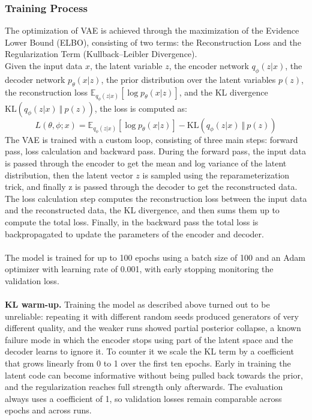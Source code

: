 \subsubsection{Training Process}
The optimization of VAE is achieved through the maximization of the Evidence Lower Bound (ELBO), consisting of two terms: the Reconstruction Loss and the Regularization Term (Kullback--Leibler Divergence).\\Given the input data $x$, the latent variable $z$, the encoder network $q_\phi(z\vert x)$, the decoder network $p_\theta(x\vert z)$, the prior distribution over the latent variables $p(z)$, the reconstruction loss $\mathbb{E}_{q_{\phi}(z\vert x)}[\log p_\theta(x\vert z)]$, and the KL divergence $\mathrm{KL}(q_\phi(z\vert x)\ \Vert\ p(z))$, the loss is computed as:
\\
\begin{equation}
L(\theta,\phi;x)=\mathbb{E}_{q_{\phi}(z\vert x)}[\log p_\theta(x\vert z)]-\mathrm{KL}(q_\phi(z\vert x)\ \Vert\ p(z))
\end{equation}
The VAE is trained with a custom loop, consisting of three main steps: forward pass, loss calculation and backward pass. During the forward pass, the input data is passed through the encoder to get the mean and log variance of the latent distribution, then the latent vector $z$ is sampled using the reparameterization trick, and finally z is passed through the decoder to get the reconstructed data. The loss calculation step computes the reconstruction loss between the input data and the reconstructed data, the KL divergence, and then sums them up to compute the total loss. Finally, in the backward pass the total loss is backpropagated to update the parameters of the encoder and decoder.
\\\\
The model is trained for up to 100 epochs using a batch size of 100 and an Adam optimizer \cite{kingma2015adam} with learning rate of 0.001, with early stopping monitoring the validation loss.
\\\\
\textbf{KL warm-up.} Training the model as described above turned out to be unreliable: repeating it with different random seeds produced generators of very different quality, and the weaker runs showed partial posterior collapse, a known failure mode in which the encoder stops using part of the latent space and the decoder learns to ignore it. To counter it we scale the KL term by a coefficient that grows linearly from 0 to 1 over the first ten epochs. Early in training the latent code can become informative without being pulled back towards the prior, and the regularization reaches full strength only afterwards. The evaluation always uses a coefficient of 1, so validation losses remain comparable across epochs and across runs.
